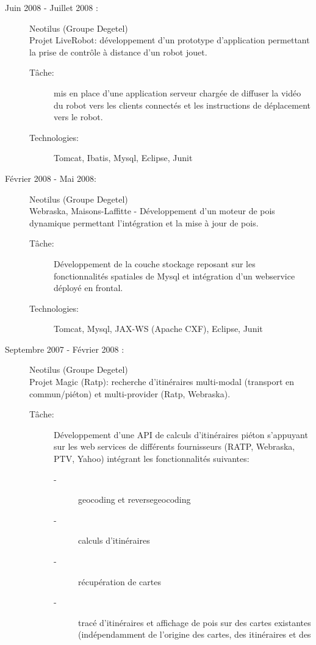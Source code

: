 \documentclass[11pt, oneside, a4paper, french]{article}
\begin{document}
\begin{description}
\item[Juin 2008 - Juillet 2008 :] Neotilus (Groupe Degetel)\\
  Projet LiveRobot: d\'eveloppement d'un prototype d'application permettant la prise de contrôle à distance d'un robot jouet. 
  \begin{description}
  \item[T\^ache:] mis en place d'une application serveur charg\'ee de diffuser la vid\'eo du robot vers les clients connect\'es et les instructions de d\'eplacement vers le robot.
  \item[Technologies:] Tomcat, Ibatis, Mysql, Eclipse, Junit 
  \end{description}

\item[F\'evrier 2008 - Mai 2008:]  Neotilus (Groupe Degetel)\\
Webraska, Maisons-Laffitte - D\'eveloppement d'un moteur de pois dynamique permettant l'int\'egration et la mise \`a jour de pois.
  \begin{description}
  \item[T\^ache:] D\'eveloppement de la couche stockage reposant sur les fonctionnalit\'es spatiales de Mysql et int\'egration d'un webservice d\'eploy\'e en frontal.
  \item[Technologies:] Tomcat, Mysql, JAX-WS (Apache CXF), Eclipse, Junit
  \end{description}


\item[Septembre 2007 - F\'evrier 2008 :]  Neotilus (Groupe Degetel)\\
  Projet Magic (Ratp): recherche d'itin\'eraires multi-modal (transport en commun/pi\'eton) et multi-provider (Ratp, Webraska).
  \begin{description}
  \item[T\^ache:] D\'eveloppement d'une API de calculs d'itin\'eraires pi\'eton s'appuyant sur les web services de diff\'erents fournisseurs (RATP, Webraska, PTV, Yahoo) int\'egrant les fonctionnalit\'es suivantes:
    \begin{description}
    \item[-] geocoding et reversegeocoding
    \item[-] calculs d'itin\'eraires
    \item[-] r\'ecup\'eration de cartes
    \item[-] trac\'e d'itin\'eraires et affichage de pois sur des cartes existantes (ind\'ependamment de l'origine des cartes, des itin\'eraires et des 
    \end{description}
    

\end{description}
\end{description}
\end{document}
